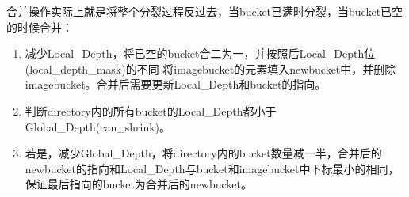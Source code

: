 \documentclass[a4paper]{article}
\begin{document}
合并操作实际上就是将整个分裂过程反过去，当bucket已满时分裂，当bucket已空的时候合并：

\begin{enumerate}
   \item 减少Local\_Depth，将已空的bucket合二为一，并按照后Local\_Depth位(local\_depth\_mask)的不同
   将imagebucket的元素填入newbucket中，并删除imagebucket。合并后需要更新Local\_Depth和bucket的指向。
   \item 判断directory内的所有bucket的Local\_Depth都小于Global\_Depth(can\_shrink)。
   \item 若是，减少Global\_Depth，将directory内的bucket数量减一半，合并后的newbucket的指向和Local\_Depth与bucket和imagebucket中下标最小的相同，
   保证最后指向的bucket为合并后的newbucket。
\end{enumerate}
\end{document}
